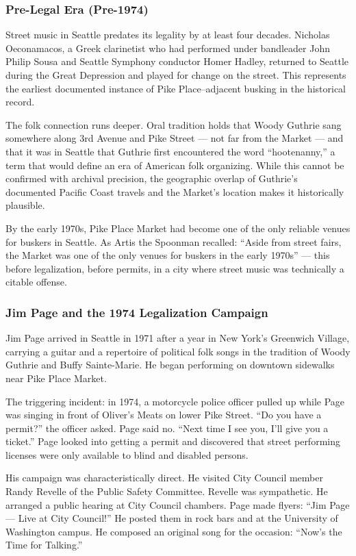 \documentclass[11pt,letterpaper]{article}
\begin{document}
\subsubsection{Pre-Legal Era (Pre-1974)}

Street music in Seattle predates its legality by at least four decades. Nicholas Oeconamacos, a Greek clarinetist who had performed under bandleader John Philip Sousa and Seattle Symphony conductor Homer Hadley, returned to Seattle during the Great Depression and played for change on the street. This represents the earliest documented instance of Pike Place--adjacent busking in the historical record.

The folk connection runs deeper. Oral tradition holds that Woody Guthrie sang somewhere along 3rd Avenue and Pike Street --- not far from the Market --- and that it was in Seattle that Guthrie first encountered the word ``hootenanny,'' a term that would define an era of American folk organizing. While this cannot be confirmed with archival precision, the geographic overlap of Guthrie's documented Pacific Coast travels and the Market's location makes it historically plausible.

By the early 1970s, Pike Place Market had become one of the only reliable venues for buskers in Seattle. As Artis the Spoonman recalled: ``Aside from street fairs, the Market was one of the only venues for buskers in the early 1970s'' --- this before legalization, before permits, in a city where street music was technically a citable offense.

\subsubsection{Jim Page and the 1974 Legalization Campaign}

Jim Page arrived in Seattle in 1971 after a year in New York's Greenwich Village, carrying a guitar and a repertoire of political folk songs in the tradition of Woody Guthrie and Buffy Sainte-Marie. He began performing on downtown sidewalks near Pike Place Market.

The triggering incident: in 1974, a motorcycle police officer pulled up while Page was singing in front of Oliver's Meats on lower Pike Street. ``Do you have a permit?'' the officer asked. Page said no. ``Next time I see you, I'll give you a ticket.'' Page looked into getting a permit and discovered that street performing licenses were only available to blind and disabled persons.

His campaign was characteristically direct. He visited City Council member Randy Revelle of the Public Safety Committee. Revelle was sympathetic. He arranged a public hearing at City Council chambers. Page made flyers: ``Jim Page --- Live at City Council!'' He posted them in rock bars and at the University of Washington campus. He composed an original song for the occasion: ``Now's the Time for Talking.''
\end{document}
